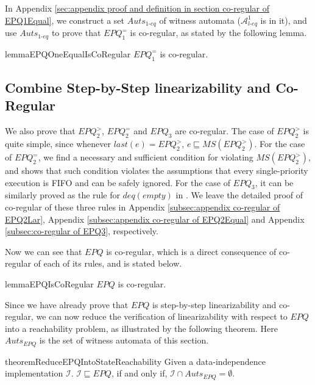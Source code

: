 In Appendix \ref{sec:appendix proof and definition in section co-regular of EPQ1Equal}, we construct a set $\textit{Auts}_{\textit{1-eq}}$ of witness automata ($\mathcal{A}_{\textit{l-eq}}^1$ is in it), and use $\textit{Auts}_{\textit{1-eq}}$ to prove that $\textit{EPQ}_1^{=}$ is co-regular, as stated by the following lemma.


\begin{restatable}{lemma}{EPQOneEqualIsCoRegular}
\label{lemma:EPQ1Equal is co-regular}
$\textit{EPQ}_1^{=}$ is co-regular.
\end{restatable}




\subsection{Combine Step-by-Step linearizability and Co-Regular}
\label{subsec:combine step-by-step linearizability and co-regular}

We also prove that $\textit{EPQ}_2^{>}$, $\textit{EPQ}_2^{=}$ and $\textit{EPQ}_3$ are co-regular. The case of $\textit{EPQ}_2^{>}$ is quite simple, since whenever $\textit{last}(e) = \textit{EPQ}_2^{>}$, $e \sqsubseteq \textit{MS}(\textit{EPQ}_2^{>})$. For the case of $\textit{EPQ}_2^{=}$, we find a necessary and sufficient condition for violating $\textit{MS}(\textit{EPQ}_2^{>})$, and shows that such condition violates the assumptions that every single-priority execution is FIFO and can be safely ignored. For the case of $\textit{EPQ}_3$, it can be similarly proved as the rule for $\textit{deq}(\textit{empty})$ in \cite{Bouajjani:2015}. We leave the detailed proof of co-regular of these three rules in Appendix \ref{subsec:appendix co-regular of EPQ2Lar}, Appendix \ref{subsec:appendix co-regular of EPQ2Equal} and Appendix \ref{subsec:co-regular of EPQ3}, respectively.

Now we can see that $\textit{EPQ}$ is co-regular, which is a direct consequence of co-regular of each of its rules, and is stated below.

\begin{restatable}{lemma}{EPQIsCoRegular}
\label{lemma:EPQ is co-regular}
$\textit{EPQ}$ is co-regular.
\end{restatable}

Since we have already prove that $\textit{EPQ}$ is step-by-step linearizability and co-regular, we can now reduce the verification of linearizability with respect to $\textit{EPQ}$ into a reachability problem, as illustrated by the following theorem. Here $\textit{Auts}_{\textit{EPQ}}$ is the set of witness automata of this section.

\begin{restatable}{theorem}{ReduceEPQIntoStateReachability}
\label{lemma:reduce EPQ into state reachability}
Given a data-independence implementation $\mathcal{I}$. $\mathcal{I} \sqsubseteq \textit{EPQ}$, if and only if, $\mathcal{I} \cap \textit{Auts}_{\textit{EPQ}} = \emptyset$.
\end{restatable} 



